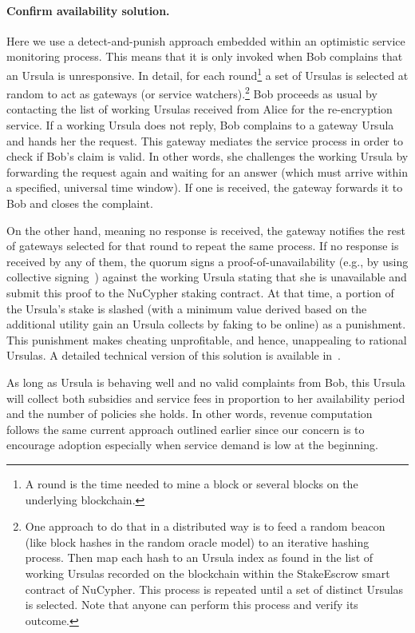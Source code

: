 \documentclass{llncs}
\begin{document}
\paragraph{Confirm availability solution.} Here we use a detect-and-punish approach embedded within an optimistic service monitoring process. This means that it is only invoked when Bob complains that an Ursula is unresponsive. In detail, for each round\footnote{A round is the time needed to mine a block or several blocks on the underlying blockchain.} a set of Ursulas is selected at random to act as gateways (or service watchers).\footnote{One approach to do that in a distributed way is to feed a random beacon (like block hashes in the random oracle model) to an iterative hashing process. Then map each hash to an Ursula index as found in the list of working Ursulas recorded on the blockchain within the StakeEscrow smart contract of NuCypher. This process is repeated until a set of distinct Ursulas is selected. Note that anyone can perform this process and verify its outcome.} Bob proceeds as usual by contacting the list of working Ursulas received from Alice for the re-encryption service. If a working Ursula does not reply, Bob complains to a gateway Ursula and hands her the request. This gateway mediates the service process in order to check if Bob's claim is valid. In other words, she challenges the working Ursula by forwarding the request again and waiting for an answer (which must arrive within a specified, universal time window). If one is received, the gateway forwards it to Bob and closes the complaint.


On the other hand, meaning no response is received, the gateway notifies the rest of gateways selected for that round to repeat the same process. If no response is received by any of them, the quorum signs a proof-of-unavailability (e.g., by using collective signing~\cite{syta2016keeping}) against the working Ursula stating that she is unavailable and submit this proof to the NuCypher staking contract. At that time, a portion of the Ursula's stake is slashed (with a minimum value derived based on the additional utility gain an Ursula collects by faking to be online) as a punishment. This punishment makes cheating unprofitable, and hence, unappealing to rational Ursulas. A detailed technical version of this solution is available in~\cite{confirm-activity-draft}.


As long as Ursula is behaving well and no valid complaints from Bob, this Ursula will collect both subsidies and service fees in proportion to her availability period and the number of policies she holds. In other words, revenue computation follows the same current approach outlined earlier since our concern is to encourage adoption especially when service demand is low at the beginning.
\end{document}
